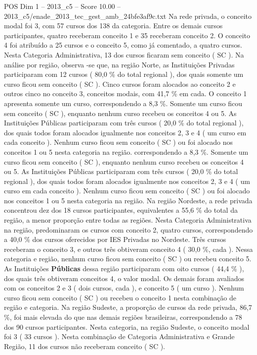 \begin{textsample}{POS Dim 1 – 2013\_c5 – Score 10.00 – 2013\_c5/enade\_2013\_tec\_gest\_amb\_24bfe3af9c.txt}
Na rede privada, o conceito modal foi 3, com 57 cursos dos 138 da categoria.
Entre os demais cursos participantes, quatro receberam conceito 1 e 35 receberam conceito 2.
O conceito 4 foi atribuído a 25 cursos e o conceito 5, como já comentado, a quatro cursos.
Nesta Categoria Administrativa, 13 dos cursos ficaram sem conceito ( SC ).
Na análise por região, observa -se que, na região Norte, as Instituições Privadas participaram com 12 cursos ( 80,0 \% do total regional ), dos quais somente um curso ficou sem conceito ( SC ).
Cinco cursos foram alocados ao conceito 2 e outros cinco no conceito 3, conceitos modais, com 41,7 \% em cada.
O conceito 1 apresenta somente um curso, correspondendo a 8,3 \%.
Somente um curso ficou sem conceito ( SC ), enquanto nenhum curso recebeu os conceitos 4 ou 5.
As Instituições Públicas participaram com três cursos ( 20,0 \% do total regional ), dos quais todos foram alocados igualmente nos conceitos 2, 3 e 4 ( um curso em cada conceito ).
Nenhum curso ficou sem conceito ( SC ) ou foi alocado nos conceitos 1 ou 5 nesta categoria na região. correspondendo a 8,3 \%.
Somente um curso ficou sem conceito ( SC ), enquanto nenhum curso recebeu os conceitos 4 ou 5.
As Instituições Públicas participaram com três cursos ( 20,0 \% do total regional ), dos quais todos foram alocados igualmente nos conceitos 2, 3 e 4 ( um curso em cada conceito ).
Nenhum curso ficou sem conceito ( SC ) ou foi alocado nos conceitos 1 ou 5 nesta categoria na região.
Na região Nordeste, a rede privada concentrou dez dos 18 cursos participantes, equivalentes a 55,6 \% do total da região, a menor proporção entre todas as regiões.
Nesta Categoria Administrativa na região, predominaram os cursos com conceito 2, quatro cursos, correspondendo a 40,0 \% dos cursos oferecidos por IES Privadas no Nordeste.
Três cursos receberam o conceito 3, e outros três obtiveram conceito 4 ( 30,0 \%, cada ).
Nessa categoria e região, nenhum curso ficou sem conceito ( SC ) ou recebeu conceito 5.
As Instituições \textbf{Públicas} dessa região participaram com oito cursos ( 44,4 \% ), dos quais três obtiveram conceitos 4, o valor modal.
Os demais foram avaliados com os conceitos 2 e 3 ( dois cursos, cada ), e conceito 5 ( um curso ).
Nenhum curso ficou sem conceito ( SC ) ou recebeu o conceito 1 nesta combinação de região e categoria.
Na região Sudeste, a proporção de cursos da rede privada, 86,7 \%, foi mais elevada do que nas demais regiões brasileiras, correspondendo a 78 dos 90 cursos participantes.
Nesta categoria, na região Sudeste, o conceito modal foi 3 ( 33 cursos ).
Nesta combinação de Categoria Administrativa e Grande Região, 11 dos cursos não receberam conceito ( SC ).

\end{textsample}
